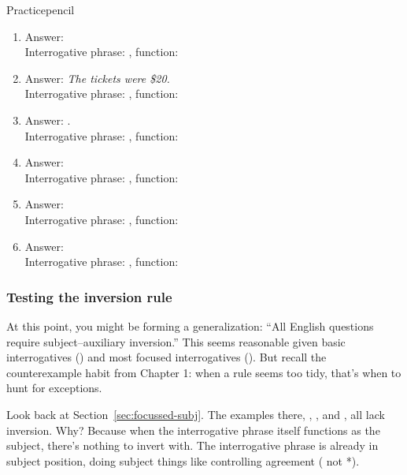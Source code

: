 \begin{tblsframedsymbol}{Practice}{pencil}
\begin{enumerate}[noitemsep, leftmargin=*]
            \item Answer: \\
            Interrogative phrase: \gap, function: \gap

            \item Answer: \textit{The tickets were \$20.}\\
            Interrogative phrase: \gap, function: \gap

            \item Answer: .\\
            Interrogative phrase: \gap, function: \gap

            \item Answer: \\
            Interrogative phrase: \gap, function: \gap

            \item Answer: \\
            Interrogative phrase: \gap, function: \gap

            \item Answer: \\
            Interrogative phrase: \gap, function: \gap


        \end{enumerate}
    \end{tblsframedsymbol}

\subsubsection*{Testing the inversion rule}

At this point, you might be forming a generalization: \enquote{All English questions require subject--auxiliary inversion.} This seems reasonable given basic interrogatives () and most focused interrogatives (). But recall the counterexample habit from Chapter 1: when a rule seems too tidy, that's when to hunt for exceptions.

Look back at Section~\ref{sec:focussed-subj}. The examples there, , , and , all lack inversion. Why? Because when the interrogative phrase itself functions as the subject, there's nothing to invert with. The interrogative phrase is already in subject position, doing subject things like controlling agreement ( not *).

